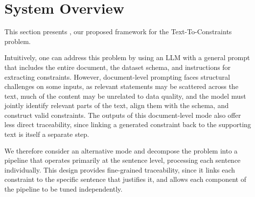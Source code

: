 \section{System Overview}
\label{sec:overview}


This section presents \system, our proposed framework for the Text-To-Constraints problem. 

Intuitively, one can address this problem by using an LLM with a general prompt that includes the entire document, the dataset schema, and instructions for extracting constraints. However, document-level prompting faces structural challenges on some inputs, as relevant statements may be scattered across the text, much of the content may be unrelated to data quality, and the model must jointly identify relevant parts of the text, align them with the schema, and construct valid constraints. 
The outputs of this document-level mode also offer less direct traceability, since linking a generated constraint back to the supporting text is itself a separate step.

We therefore consider an alternative mode and decompose the problem into a pipeline that operates primarily at the sentence level, processing each sentence individually. This design provides fine-grained traceability, since it links each constraint to the specific sentence that justifies it, and allows each component of the pipeline to be tuned independently.

